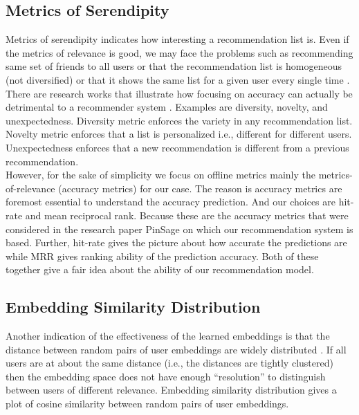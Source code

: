 \documentclass{kththesis}
\begin{document}

\newpage
\subsection{Metrics of Serendipity}
Metrics of serendipity indicates how interesting a recommendation list is. Even if the metrics of relevance is good, we may face the problems such as recommending same set of friends to all users or that the recommendation list is homogeneous (not diversified) or that it shows the same list for a given user every single time \cite{serene}. There are research works that illustrate how focusing on accuracy can actually be detrimental to a recommender system \cite{sean}. Examples are diversity, novelty, and unexpectedness. Diversity metric enforces the variety in any recommendation list. Novelty metric enforces that a list is personalized i.e., different for different users. Unexpectedness enforces that a new recommendation is different from a previous recommendation.\\

However, for the sake of simplicity we focus on offline metrics mainly the metrics-of-relevance (accuracy metrics) for our case. The reason is accuracy metrics are foremost essential to understand the accuracy prediction. And our choices are hit-rate and mean reciprocal rank. Because these are the accuracy metrics that were considered in the research paper PinSage \cite{PinSage} on which our recommendation system is based. Further, hit-rate gives the picture about how accurate the predictions are while MRR gives ranking ability of the prediction accuracy. Both of these together give a fair idea about the ability of our recommendation model. \\

\subsection{Embedding Similarity Distribution}
Another indication of the effectiveness of the learned embeddings is that the distance between random pairs of user embeddings are widely distributed \cite{PinSage}. If all users are at about the same distance (i.e., the distances are tightly clustered) then the embedding space does not have enough “resolution” to distinguish between users of different relevance. Embedding similarity distribution gives a plot of cosine similarity between random pairs of user embeddings.\\
\end{document}
